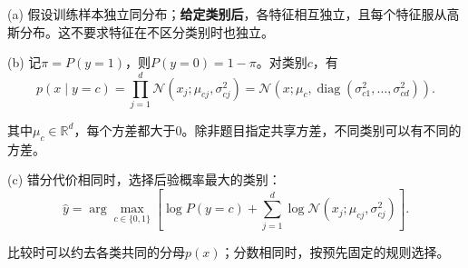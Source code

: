 (a) 假设训练样本独立同分布；\textbf{给定类别后}，各特征相互独立，且每个特征服从高斯分布。这不要求特征在不区分类别时也独立。


(b) 记\(\pi=P(y=1)\)，则\(P(y=0)=1-\pi\)。对类别\(c\)，有
\[
p(x\mid y=c)=\prod_{j=1}^d\mathcal N(x_j;\mu_{cj},\sigma^2_{cj})=\mathcal N(x;\mu_c,\operatorname{diag}(\sigma^2_{c1},\ldots,\sigma^2_{cd})).
\]


其中\(\mu_c\in\mathbb R^d\)，每个方差都大于0。除非题目指定共享方差，不同类别可以有不同的方差。


(c) 错分代价相同时，选择后验概率最大的类别：
\[
\hat y=\arg\max_{c\in\{0,1\}}\left[\log P(y=c)+\sum_{j=1}^d\log\mathcal N(x_j;\mu_{cj},\sigma^2_{cj})\right].
\]


比较时可以约去各类共同的分母\(p(x)\)；分数相同时，按预先固定的规则选择。
